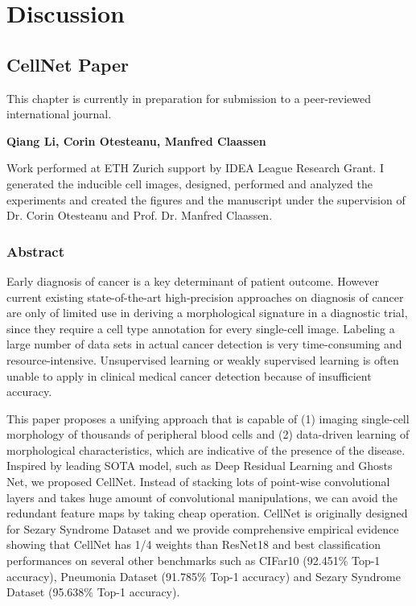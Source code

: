\chapter{Discussion}
\label{sec:examples}

\section{CellNet Paper}
\label{sec:lorem}

This chapter is currently in preparation for submission to a peer-reviewed international journal.

\textbf{Qiang Li, Corin Otesteanu, Manfred Claassen}

Work performed at ETH Zurich support by IDEA League Research Grant.
I generated the inducible cell images, designed, performed and analyzed the experiments and created the figures and the manuscript under the supervision of Dr. Corin Otesteanu and Prof. Dr. Manfred Claassen.

\subsection{Abstract}
\label{sec:abstract}
Early diagnosis of cancer is a key determinant of patient outcome. However current existing state-of-the-art high-precision approaches on diagnosis of cancer are only of limited use in deriving a morphological signature in a diagnostic trial, since they require a cell type annotation for every single-cell image. Labeling a large number of data sets in actual cancer detection is very time-consuming and resource-intensive. Unsupervised learning or weakly supervised learning is often unable to apply in clinical medical cancer detection because of insufficient accuracy.

This paper proposes a unifying approach that is capable of (1) imaging single-cell morphology of thousands of peripheral blood cells and (2) data-driven learning of morphological characteristics, which are indicative of the presence of the disease.
Inspired by leading SOTA model, such as Deep Residual Learning\cite{b20} and Ghosts Net\cite{b19}, we proposed CellNet. Instead of stacking lots of point-wise convolutional layers and takes huge amount of convolutional manipulations, we can avoid the redundant feature maps by taking cheap operation. CellNet is originally designed for Sezary Syndrome Dataset and we provide comprehensive empirical evidence showing that CellNet has 1/4 weights than ResNet18 \cite{b20} and best classification performances on several other benchmarks such as CIFar10 \cite{b21} (92.451\% Top-1 accuracy), Pneumonia Dataset\cite{b38} (91.785\% Top-1 accuracy) and Sezary Syndrome Dataset (95.638\% Top-1 accuracy).

